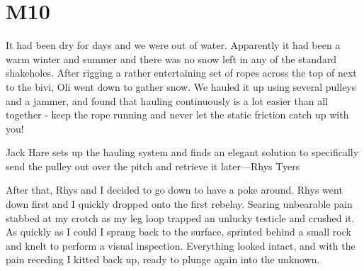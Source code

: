 \section{M10}
\begin{marginfigure}
\end{marginfigure}
It had been dry for days and we were out of water. Apparently it had been a warm winter and summer and there was no snow left in any of the standard shakeholes. After rigging a rather entertaining set of ropes across the top of  next to the bivi, Oli went down to gather snow. We hauled it up using several pulleys and a jammer, and found that hauling continuously is a lot easier than all together - keep the rope running and never let the static friction catch up with you!

\begin{marginfigure}
\checkoddpage \ifoddpage \forcerectofloat \else \forceversofloat \fi
\centering
 \caption{Jack Hare sets up the hauling system and finds an elegant solution to specifically send the pulley out over the pitch and retrieve it later---Rhys Tyers}
 \label{near sump}
\end{marginfigure}

After that, Rhys and I decided to go down to have a poke around. Rhys went down first and I quickly dropped onto the first rebelay. Searing unbearable pain stabbed at my crotch as my leg loop trapped an unlucky testicle and crushed it. As quickly as I could I sprang back to the surface, sprinted behind a small rock and knelt to perform a visual inspection. Everything looked intact, and with the pain receding I kitted back up, ready to plunge again into the unknown.

